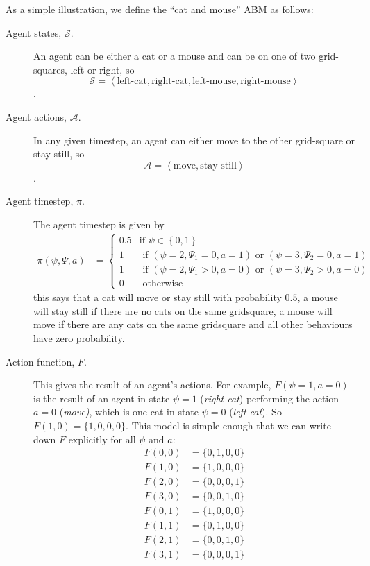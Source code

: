 \documentclass{article}
\begin{document}
As a simple illustration, we define the ``cat and mouse'' ABM as follows: 
\begin{description}
	\item[Agent states, $\mathcal{S}$.] An agent can be either a cat or a mouse and can be on one of two grid-squares, left or right, so \[\mathcal{S} = \left<\textrm{left-cat}, \textrm{right-cat}, \textrm{left-mouse}, \textrm{right-mouse} \right>\]. 

	\item[Agent actions, $\mathcal{A}$.] In any given timestep, an agent can either move to the other grid-square or stay still, so \[\mathcal{A} = \left<\textrm{move}, \textrm{stay still}\right>\].
	

	\item[Agent timestep, $\pi$.] The agent timestep is given by
	\[
	\begin{aligned}
	\pi(\psi, \Psi, a) &=
	\begin{cases}
	0.5 & \text{if } \psi \in \left\{0, 1\right\}\\  %
	1 & \text{ if }(\psi = 2, \Psi_1 = 0, a=1) \text{ or } (\psi=3, \Psi_2 = 0, a=1)\\
	1 & \text{ if } (\psi = 2, \Psi_1 > 0, a=0) \text{ or } (\psi=3, \Psi_2 > 0, a=0)\\
	0 & \text{ otherwise}
	\end{cases}
	\end{aligned}
	\]
	 this says that a cat will move or stay still with probability $0.5$, a mouse will stay still if there are no cats on the same gridsquare, a mouse will move if there are any cats on the same gridsquare and all other behaviours have zero probability.

\item[Action function, $F$.] This gives the result of an agent's actions. For example, $F(\psi=1, a=0)$ is the result of an agent in state $\psi=1$ (\textit{right cat}) performing the action $a=0$ (\textit{move)}, which is one cat in state $\psi=0$ (\textit{left cat}). So $F(1,0) = \{1,0,0,0\}$. This model is simple enough that we can write down $F$ explicitly for all $\psi$ and $a$:
\[
\begin{aligned}
F(0, 0) &= \{0,1,0,0\}\\
F(1, 0) &= \{1,0,0,0\}\\
F(2, 0) &= \{0,0,0,1\}\\
F(3, 0) &= \{0,0,1,0\}\\
F(0, 1) &= \{1,0,0,0\}\\
F(1, 1) &= \{0,1,0,0\}\\
F(2, 1) &= \{0,0,1,0\}\\
F(3, 1) &= \{0,0,0,1\}\\
\end{aligned}
\]
\end{description}
\end{document}

